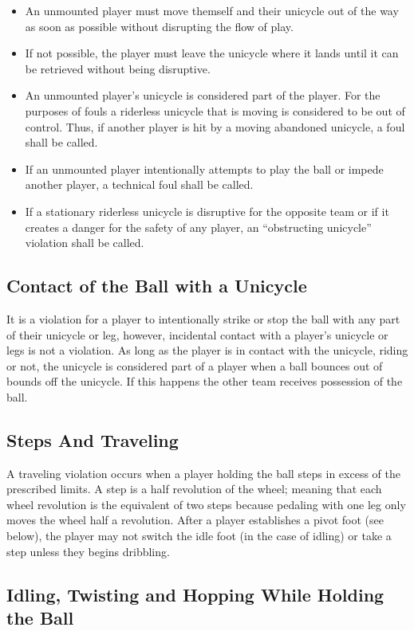 \begin{itemize}
\item An unmounted player must move themself and their unicycle out of the way as soon as possible without disrupting the flow of play.
\item If not possible, the player must leave the unicycle where it lands until it can be retrieved without being disruptive.
\item An unmounted player's unicycle is considered part of the player.
For the purposes of fouls a riderless unicycle that is moving is considered to be out of control.
Thus, if another player is hit by a moving abandoned unicycle, a foul shall be called.
\item If an unmounted player intentionally attempts to play the ball or impede another player, a technical foul shall be called.
\item If a stationary riderless unicycle is disruptive for the opposite team or if it creates a danger for the safety of any player, an ``obstructing unicycle'' violation shall be called.
\end{itemize}

\subsection{Contact of the Ball with a Unicycle}
It is a violation for a player to intentionally strike or stop the ball with any part of their unicycle or leg, however, incidental contact with a player's unicycle or legs is not a violation.
As long as the player is in contact with the unicycle, riding or not, the unicycle is considered part of a player when a ball bounces out of bounds off the unicycle.
If this happens the other team receives possession of the ball.

\subsection{Steps And Traveling}
A traveling violation occurs when a player holding the ball steps in excess of the prescribed limits.
A step is a half revolution of the wheel; meaning that each wheel revolution is the equivalent of two steps because pedaling with one leg only moves the wheel half a revolution.
After a player establishes a pivot foot (see below), the player may not switch the idle foot (in the case of idling) or take a step unless they begins dribbling.

\subsection{Idling, Twisting and Hopping While Holding the Ball}

